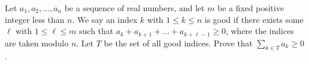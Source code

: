 Let $a_1,a_2,\ldots,a_n$ be a sequence of real numbers, and let $m$ be a fixed positive integer less than $n$. We say an index $k$ with $1\leq k\leq n$ is good if there exists some $\ell$ with $1\leq\ell\leq m$ such that $a_k+a_{k+1}+\ldots+a_{k+\ell-1}\geq0$, where the indices are taken modulo $n$. Let $T$ be the set of all good indices. Prove that $\displaystyle\sum_{k \in T}a_k\geq0$.